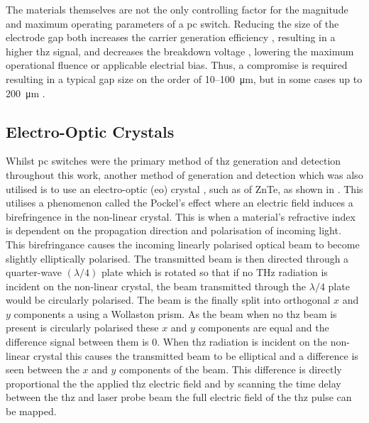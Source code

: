 The materials themselves are not the only controlling factor for the magnitude and maximum operating parameters of a \acrshort{pc} switch. Reducing the size of the electrode gap both increases the carrier generation efficiency \cite{Tani2002}, resulting in a higher \acrshort{thz} signal, and decreases the breakdown voltage \cite{Stone2004}, lowering the maximum operational fluence or applicable electrial bias. Thus, a compromise is required resulting in a typical gap size on the order of 10\nobreakdash--\SI{100}{\micro\metre}, but in some cases up to \SI{200}{\micro\metre} \cite{Bacon2017}. 

\subsection{Electro-Optic Crystals}
Whilst \acrshort{pc} switches were the primary method of \acrshort{thz} generation and detection throughout this work, 
another method of generation and detection which was also utilised is to use an electro\nobreakdash-optic (\acrshort{eo}) crystal \cite{Wu1995}, such as of ZnTe, as shown in . This utilises a phenomenon called the Pockel’s effect \cite{vanderValk} where an electric field induces a birefringence in the non\nobreakdash-linear crystal. This is when a material's refractive index is dependent on the propagation direction and polarisation of incoming light. This birefringance causes the incoming linearly polarised optical beam to become slightly elliptically polarised. The transmitted beam is then directed through a quarter\nobreakdash-wave \((\lambda/4)\) plate which is rotated so that if no THz radiation is incident on the non\nobreakdash-linear crystal, the beam transmitted through the \(\lambda/4\) plate would be circularly polarised. The beam is the finally split into orthogonal \(x\) and \(y\) components a using a Wollaston prism. As the beam when no \acrshort{thz} beam is present is circularly polarised these \(x\) and \(y\) components are equal and the difference signal between them is 0. When \acrshort{thz} radiation is incident on the non\nobreakdash-linear crystal this causes the transmitted beam to be elliptical and a difference is seen between the \(x\) and \(y\) components of the beam. This difference is directly proportional the the applied \acrshort{thz} electric field and by scanning the time delay between the \acrshort{thz} and laser probe beam the full electric field of the \acrshort{thz} pulse can be mapped. 

